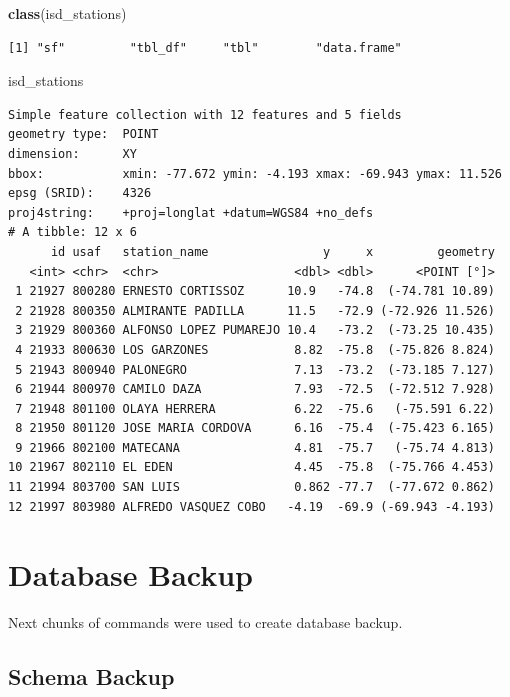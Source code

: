 \documentclass[12pt,oneside]{reedthesis}
\newenvironment{Shaded}{\begin{snugshade}}{\end{snugshade}}
\newcommand{\KeywordTok}[1]{\textcolor[rgb]{0.13,0.29,0.53}{\textbf{#1}}}
\newcommand{\NormalTok}[1]{#1}
\begin{document}
\vspace{0.4cm}
\begin{Shaded}
\begin{Highlighting}[]
        \KeywordTok{class}\NormalTok{(isd_stations)}
\end{Highlighting}
\end{Shaded}
\begin{verbatim}
[1] "sf"         "tbl_df"     "tbl"        "data.frame"
\end{verbatim}
\vspace{0.4cm}
\begin{Shaded}
\begin{Highlighting}[]
\NormalTok{        isd_stations}
\end{Highlighting}
\end{Shaded}
\begin{verbatim}
Simple feature collection with 12 features and 5 fields
geometry type:  POINT
dimension:      XY
bbox:           xmin: -77.672 ymin: -4.193 xmax: -69.943 ymax: 11.526
epsg (SRID):    4326
proj4string:    +proj=longlat +datum=WGS84 +no_defs
# A tibble: 12 x 6
      id usaf   station_name                y     x         geometry
   <int> <chr>  <chr>                   <dbl> <dbl>      <POINT [°]>
 1 21927 800280 ERNESTO CORTISSOZ      10.9   -74.8  (-74.781 10.89)
 2 21928 800350 ALMIRANTE PADILLA      11.5   -72.9 (-72.926 11.526)
 3 21929 800360 ALFONSO LOPEZ PUMAREJO 10.4   -73.2  (-73.25 10.435)
 4 21933 800630 LOS GARZONES            8.82  -75.8  (-75.826 8.824)
 5 21943 800940 PALONEGRO               7.13  -73.2  (-73.185 7.127)
 6 21944 800970 CAMILO DAZA             7.93  -72.5  (-72.512 7.928)
 7 21948 801100 OLAYA HERRERA           6.22  -75.6   (-75.591 6.22)
 8 21950 801120 JOSE MARIA CORDOVA      6.16  -75.4  (-75.423 6.165)
 9 21966 802100 MATECANA                4.81  -75.7   (-75.74 4.813)
10 21967 802110 EL EDEN                 4.45  -75.8  (-75.766 4.453)
11 21994 803700 SAN LUIS                0.862 -77.7  (-77.672 0.862)
12 21997 803980 ALFREDO VASQUEZ COBO   -4.19  -69.9 (-69.943 -4.193)
\end{verbatim}
\normalsize

\hypertarget{database-backup}{%
\section{Database Backup}\label{database-backup}}

Next chunks of commands were used to create database backup.

\hypertarget{schema-backup}{%
\subsection{Schema Backup}\label{schema-backup}}
\end{document}
